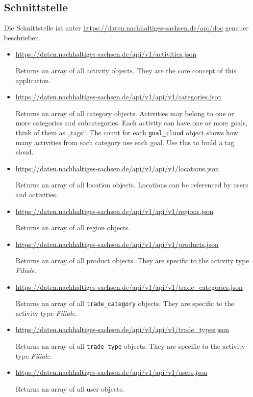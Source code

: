 \documentclass[a4paper,11pt]{article}
\begin{document}
\subsection{Schnittstelle}

Die Schnittstelle ist unter
\url{https://daten.nachhaltiges-sachsen.de/api/doc} genauer beschrieben.

\begin{itemize}
\item \url{https://daten.nachhaltiges-sachsen.de/api/v1/activities.json}

Returns an array of all activity objects. They are the core concept of this
application.

\item
  \url{https://daten.nachhaltiges-sachsen.de/api/v1/api/v1/categories.json} 

Returns an array of all category objects. Activities may belong to one or more
categories and subcategories. Each activity can have one or more goals, think
of them as „tags“. The count for each \texttt{goal\_cloud} object shows how
many activities from each category use each goal. Use this to build a tag
cloud.

\item \url{https://daten.nachhaltiges-sachsen.de/api/v1/api/v1/locations.json} 

Returns an array of all location objects. Locations can be referenced by users
and activities.

\item \url{https://daten.nachhaltiges-sachsen.de/api/v1/api/v1/regions.json}

Returns an array of all region objects.
 
\item \url{https://daten.nachhaltiges-sachsen.de/api/v1/api/v1/products.json}

Returns an array of all product objects. They are specific to the activity
type \emph{Filiale}.

\item
  \url{https://daten.nachhaltiges-sachsen.de/api/v1/api/v1/trade_categories.json} 

Returns an array of all \texttt{trade\_category} objects. They are specific to
the activity type \emph{Filiale}.

\item
  \url{https://daten.nachhaltiges-sachsen.de/api/v1/api/v1/trade_types.json} 

Returns an array of all \texttt{trade\_type} objects. They are specific to the
activity type \emph{Filiale}.

\item \url{https://daten.nachhaltiges-sachsen.de/api/v1/api/v1/users.json}

Returns an array of all user objects. 
\end{itemize}
\end{document}
